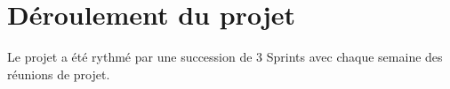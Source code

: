 \section{Déroulement du projet}

Le projet a été rythmé par une succession de 3 Sprints avec chaque semaine des réunions de projet.  


